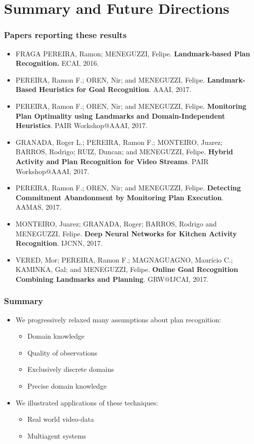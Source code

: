 \documentclass{beamer}
\begin{document}
\section{Summary and Future Directions}

\begin{frame}[c]\frametitle{Papers reporting these results}
	\footnotesize
	\begin{itemize}
	\item[] FRAGA PEREIRA, Ramon; MENEGUZZI, Felipe. \textbf{Landmark-based Plan Recognition.} ECAI, 2016.
	\item[] PEREIRA, Ramon F.; OREN, Nir; and MENEGUZZI, Felipe. \textbf{Landmark-Based Heuristics for Goal Recognition}. AAAI, 2017.
	\item[] PEREIRA, Ramon F.; OREN, Nir; and MENEGUZZI, Felipe. \textbf{Monitoring Plan Optimality using Landmarks and Domain-Independent Heuristics}. PAIR Workshop@AAAI, 2017.
    \item[] GRANADA, Roger L.; PEREIRA, Ramon F.; MONTEIRO, Juarez; BARROS, Rodrigo; RUIZ, Duncan; and MENEGUZZI, Felipe. \textbf{Hybrid Activity and Plan Recognition for Video Streams}. PAIR Workshop@AAAI, 2017.
    \item[] PEREIRA, Ramon F.; OREN, Nir; and MENEGUZZI, Felipe. \textbf{Detecting Commitment Abandonment by Monitoring Plan Execution}. AAMAS, 2017.
    \item[] MONTEIRO, Juarez; GRANADA, Roger; BARROS, Rodrigo and MENEGUZZI, Felipe. \textbf{Deep Neural Networks for Kitchen Activity Recognition}. IJCNN, 2017.
    \item[] VERED, Mor; PEREIRA, Ramon F.; MAGNAGUAGNO, Maurício C.; KAMINKA, Gal; and MENEGUZZI, Felipe. \textbf{Online Goal Recognition Combining Landmarks and Planning}. GRW@IJCAI, 2017.
	\end{itemize}
\end{frame}

\begin{frame}[c]\frametitle{Summary}
	\begin{itemize}
		\item We progressively relaxed many assumptions about plan recognition:
		\begin{itemize}
			\item Domain knowledge
			\item Quality of observations
			\item Exclusively discrete domains
			\item Precise domain knowledge
		\end{itemize}
		\item We illustrated applications of these techniques:
		\begin{itemize}
			\item Real world video-data
			\item Multiagent systems
		\end{itemize}
	\end{itemize}
\end{frame}
\end{document}
